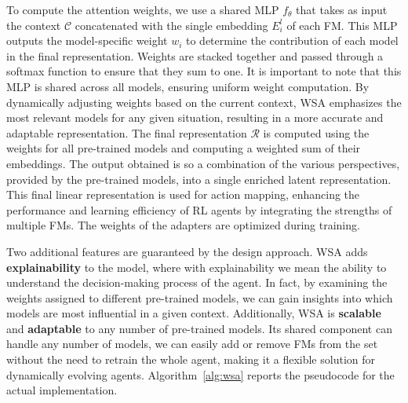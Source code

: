 To compute the attention weights, we use a shared MLP $f_\theta$ that takes as input the context $\mathcal{C}$ concatenated with the single embedding $E^{l}_i$ of each FM\@.
This MLP outputs the model-specific weight $w_i$ to determine the contribution of each model in the final representation.
Weights are stacked together and passed through a softmax function to ensure that they sum to one.
It is important to note that this MLP is shared across all models, ensuring uniform weight computation.
By dynamically adjusting weights based on the current context, WSA emphasizes the most relevant models for any given situation, resulting in a more accurate and adaptable representation.
The final representation $\mathcal{R}$ is computed using the weights for all pre-trained models and computing a weighted sum of their embeddings.
The output obtained is so a combination of the various perspectives, provided by the pre-trained models, into a single enriched latent representation.
This final linear representation is used for action mapping, enhancing the performance and learning efficiency of RL agents by integrating the strengths of multiple FMs.
The weights of the adapters are optimized during training.

Two additional features are guaranteed by the design approach.
WSA adds \textbf{explainability} to the model, where with explainability we mean the ability to understand the decision-making process of the agent.
In fact, by examining the weights assigned to different pre-trained models, we can gain insights into which models are most influential in a given context.
Additionally, WSA is \textbf{scalable} and \textbf{adaptable} to any number of pre-trained models.
Its shared component can handle any number of models, we can easily add or remove FMs from the set without the need to retrain the whole agent, making it a flexible solution for dynamically evolving agents.
Algorithm~\ref{alg:wsa} reports the pseudocode for the actual implementation.


